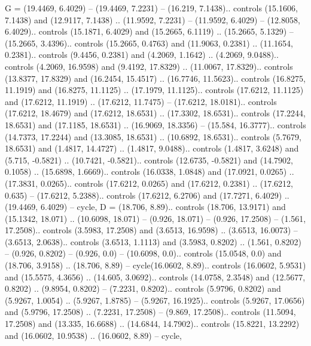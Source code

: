 {G} = {(19.4469, 6.4029) -- (19.4469, 7.2231) -- (16.219, 7.1438).. controls (15.1606, 7.1438) and (12.9117, 7.1438) .. (11.9592, 7.2231) -- (11.9592, 6.4029) -- (12.8058, 6.4029).. controls (15.1871, 6.4029) and (15.2665, 6.1119) .. (15.2665, 5.1329) -- (15.2665, 3.4396).. controls (15.2665, 0.4763) and (11.9063, 0.2381) .. (11.1654, 0.2381).. controls (9.4456, 0.2381) and (4.2069, 1.1642) .. (4.2069, 9.0488).. controls (4.2069, 16.9598) and (9.4192, 17.8329) .. (11.0067, 17.8329).. controls (13.8377, 17.8329) and (16.2454, 15.4517) .. (16.7746, 11.5623).. controls (16.8275, 11.1919) and (16.8275, 11.1125) .. (17.1979, 11.1125).. controls (17.6212, 11.1125) and (17.6212, 11.1919) .. (17.6212, 11.7475) -- (17.6212, 18.0181).. controls (17.6212, 18.4679) and (17.6212, 18.6531) .. (17.3302, 18.6531).. controls (17.2244, 18.6531) and (17.1185, 18.6531) .. (16.9069, 18.3356) -- (15.584, 16.3777).. controls (14.7373, 17.2244) and (13.3085, 18.6531) .. (10.6892, 18.6531).. controls (5.7679, 18.6531) and (1.4817, 14.4727) .. (1.4817, 9.0488).. controls (1.4817, 3.6248) and (5.715, -0.5821) .. (10.7421, -0.5821).. controls (12.6735, -0.5821) and (14.7902, 0.1058) .. (15.6898, 1.6669).. controls (16.0338, 1.0848) and (17.0921, 0.0265) .. (17.3831, 0.0265).. controls (17.6212, 0.0265) and (17.6212, 0.2381) .. (17.6212, 0.635) -- (17.6212, 5.2388).. controls (17.6212, 6.2706) and (17.7271, 6.4029) .. (19.4469, 6.4029) -- cycle},
{D} = {(18.706, 8.89).. controls (18.706, 13.9171) and (15.1342, 18.071) .. (10.6098, 18.071) -- (0.926, 18.071) -- (0.926, 17.2508) -- (1.561, 17.2508).. controls (3.5983, 17.2508) and (3.6513, 16.9598) .. (3.6513, 16.0073) -- (3.6513, 2.0638).. controls (3.6513, 1.1113) and (3.5983, 0.8202) .. (1.561, 0.8202) -- (0.926, 0.8202) -- (0.926, 0.0) -- (10.6098, 0.0).. controls (15.0548, 0.0) and (18.706, 3.9158) .. (18.706, 8.89) -- cycle(16.0602, 8.89).. controls (16.0602, 5.9531) and (15.5575, 4.3656) .. (14.605, 3.0692).. controls (14.0758, 2.3548) and (12.5677, 0.8202) .. (9.8954, 0.8202) -- (7.2231, 0.8202).. controls (5.9796, 0.8202) and (5.9267, 1.0054) .. (5.9267, 1.8785) -- (5.9267, 16.1925).. controls (5.9267, 17.0656) and (5.9796, 17.2508) .. (7.2231, 17.2508) -- (9.869, 17.2508).. controls (11.5094, 17.2508) and (13.335, 16.6688) .. (14.6844, 14.7902).. controls (15.8221, 13.2292) and (16.0602, 10.9538) .. (16.0602, 8.89) -- cycle},
